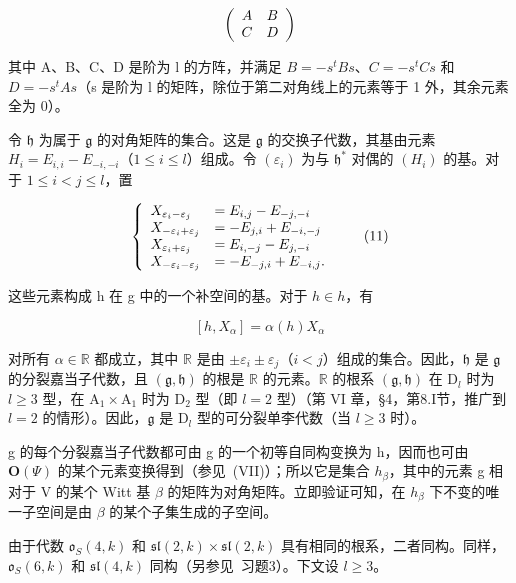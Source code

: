 \[
\left( \begin{array}{c c} A & B \\ C & D \end{array} \right)
\]

其中 A、B、C、D 是阶为 l 的方阵，并满足 \(B = -s^{t}Bs\)、\(C = -s^{t}Cs\) 和 \(D = -s^{t}As\)（s 是阶为 l 的矩阵，除位于第二对角线上的元素等于 1 外，其余元素全为 0）。

令 \(\mathfrak{h}\) 为属于 \(\mathfrak{g}\) 的对角矩阵的集合。这是 \(\mathfrak{g}\) 的交换子代数，其基由元素 \(H_{i} = E_{i,i} - E_{-i,-i}\)（\(1 \leq i \leq l\)）组成。令 \((\varepsilon_{i})\) 为与 \(\mathfrak{h}^{*}\) 对偶的 \((H_{i})\) 的基。对于 \(1 \leq i < j \leq l\)，置

\[
\left\{ \begin{array}{l l} X _ {\varepsilon_ {i} - \varepsilon_ {j}} & = E _ {i, j} - E _ {- j, - i} \\ X _ {- \varepsilon_ {i} + \varepsilon_ {j}} & = - E _ {j, i} + E _ {- i, - j} \\ X _ {\varepsilon_ {i} + \varepsilon_ {j}} & = E _ {i, - j} - E _ {j, - i} \\ X _ {- \varepsilon_ {i} - \varepsilon_ {j}} & = - E _ {- j, i} + E _ {- i, j}. \end{array} \right.\tag{11}
\]

这些元素构成 h 在 g 中的一个补空间的基。对于 \(h \in h\)，有

\[
[ h, X _ {\alpha} ] = \alpha (h) X _ {\alpha}
\]

对所有 \(\alpha \in \mathbb{R}\) 都成立，其中 \(\mathbb{R}\) 是由 \(\pm \varepsilon_i \pm \varepsilon_j\)（\(i < j\)）组成的集合。因此，\(\mathfrak{h}\) 是 \(\mathfrak{g}\) 的分裂嘉当子代数，且 \((\mathfrak{g}, \mathfrak{h})\) 的根是 \(\mathbb{R}\) 的元素。\(\mathbb{R}\) 的根系 \((\mathfrak{g}, \mathfrak{h})\) 在 \(\mathrm{D}_l\) 时为 \(l \geq 3\) 型，在 \(\mathrm{A}_1 \times \mathrm{A}_1\) 时为 \(\mathrm{D}_2\) 型（即 \(l = 2\) 型）（第 VI 章，§4，第8.I节，推广到 \(l = 2\) 的情形）。因此，\(\mathfrak{g}\) 是 \(\mathrm{D}_l\) 型的可分裂单李代数（当 \(l \geq 3\) 时）。

g 的每个分裂嘉当子代数都可由 g 的一个初等自同构变换为 h，因而也可由 \(\mathbf{O}(\varPsi)\) 的某个元素变换得到（参见~(VII)）；所以它是集合 \(h_{\beta}\)，其中的元素 g 相对于 V 的某个 Witt 基 \(\beta\) 的矩阵为对角矩阵。立即验证可知，在 \(h_{\beta}\) 下不变的唯一子空间是由 \(\beta\) 的某个子集生成的子空间。

由于代数 \(\mathfrak{o}_{S}(4,k)\) 和 \(\mathfrak{sl}(2,k)\times\mathfrak{sl}(2,k)\) 具有相同的根系，二者同构。同样，\(\mathfrak{o}_{S}(6,k)\) 和 \(\mathfrak{sl}(4,k)\) 同构（另参见~习题3）。下文设 \(l\geq3\)。

